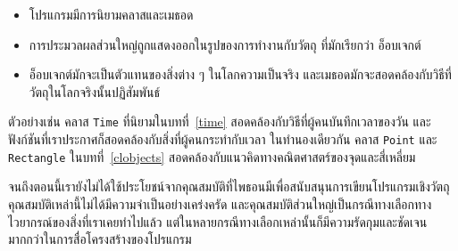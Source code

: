 \begin{itemize}

\item โปรแกรมมีการนิยามคลาสและเมธอด

\item การประมวลผลส่วนใหญ่ถูกแสดงออกในรูปของการทำงานกับวัตถุ ที่มักเรียกว่า อ็อบเจกต์

\item อ็อบเจกต์มักจะเป็นตัวแทนของสิ่งต่าง ๆ ในโลกความเป็นจริง และเมธอดมักจะสอดคล้องกับวิธีที่วัตถุในโลกจริงนั้นปฏิสัมพันธ์

\end{itemize}


ตัวอย่างเช่น คลาส {\tt Time} ที่นิยามในบทที่~\ref{time} สอดคล้องกับวิธีที่ผู้คนบันทึกเวลาของวัน 
และฟังก์ชันที่เราประกาศก็สอดคล้องกับสิ่งที่ผู้คนกระทำกับเวลา 
ในทำนองเดียวกัน คลาส {\tt Point} และ {\tt Rectangle} ในบทที่~\ref{clobjects} สอดคล้องกับแนวคิดทางคณิตศาสตร์ของจุดและสี่เหลี่ยม



จนถึงตอนนี้เรายังไม่ได้ใช้ประโยชน์จากคุณสมบัติที่ไพธอนมีเพื่อสนับสนุนการเขียนโปรแกรมเชิงวัตถุ 
คุณสมบัติเหล่านี้ไม่ได้มีความจำเป็นอย่างเคร่งครัด และคุณสมบัติส่วนใหญ่เป็นกรณีทางเลือกทางไวยากรณ์ของสิ่งที่เราเคยทำไปแล้ว 
แต่ในหลายกรณีทางเลือกเหล่านั้นก็มีความรัดกุมและชัดเจนมากกว่าในการสื่อโครงสร้างของโปรแกรม



